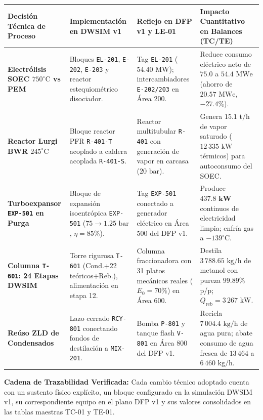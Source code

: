 \documentclass[10pt,landscape]{article}
\begin{document}
\scriptsize
\renewcommand{\arraystretch}{1.18}
\begin{tabularx}{\textwidth}{p{3.2cm} p{3.4cm} p{3.6cm} X}
  \toprule
  \rowcolor{tableheader}
  \textbf{\color{white}Decisión Técnica de Proceso} & \textbf{\color{white}Implementación en DWSIM v1} & \textbf{\color{white}Reflejo en DFP v1 y LE-01} & \textbf{\color{white}Impacto Cuantitativo en Balances (TC/TE)} \\
  \midrule
  \rowcolor{roweven}
  \textbf{Electrólisis SOEC $750^\circ\text{C}$ vs PEM} & 
  Bloques \texttt{EL-201}, \texttt{E-202}, \texttt{E-203} y reactor estequiométrico disociador. & 
  Tag \texttt{EL-201} ($54.40\text{ MW}$); intercambiadores \texttt{E-202/203} en Área 200. & 
  Reduce consumo eléctrico neto de $75.0$ a $54.4\text{ MWe}$ (ahorro de $20.57\text{ MWe}$, $-27.4\%$). \\
  \rowcolor{rowodd}
  \textbf{Reactor Lurgi BWR $245^\circ\text{C}$} & 
  Bloque reactor PFR \texttt{R-401-T} acoplado a caldera acoplada \texttt{R-401-S}. & 
  Reactor multitubular \texttt{R-401} con generación de vapor en carcasa ($20\text{ bar}$). & 
  Genera $15.1\text{ t/h}$ de vapor saturado ($12\,335\text{ kW}$ térmicos) para autoconsumo del SOEC. \\
  \rowcolor{roweven}
  \textbf{Turboexpansor \texttt{EXP-501} en Purga} & 
  Bloque de expansión isoentrópica \texttt{EXP-501} ($75 \to 1.25\text{ bar}$, $\eta=85\%$). & 
  Tag \texttt{EXP-501} conectado a generador eléctrico en Área 500 del DFP v1. & 
  Produce $\mathbf{437.8\text{ kW}}$ continuos de electricidad limpia; enfría gas a $-139^\circ\text{C}$. \\
  \rowcolor{rowodd}
  \textbf{Columna \texttt{T-601}: 24 Etapas DWSIM} & 
  Torre rigurosa \texttt{T-601} (Cond.+22 teóricos+Reb.), alimentación en etapa 12. & 
  Columna fraccionadora con 31 platos mecánicos reales ($E_0=70\%$) en Área 600. & 
  Destila $3\,788.65\text{ kg/h}$ de metanol con pureza $99.89\%$ p/p; $Q_{\text{reb}} = 3\,267\text{ kW}$. \\
  \rowcolor{roweven}
  \textbf{Reúso ZLD de Condensados} & 
  Lazo cerrado \texttt{RCY-801} conectando fondos de destilación a \texttt{MIX-201}. & 
  Bomba \texttt{P-801} y tanque flash \texttt{V-801} en Área 800 del DFP v1. & 
  Recicla $7\,004.4\text{ kg/h}$ de agua pura; abate consumo de agua fresca de $13\,464$ a $6\,460\text{ kg/h}$. \\
  \bottomrule
\end{tabularx}

\vspace{2pt}
\begin{tcolorbox}[colback=white,colframe=navyblue!40,arc=1.5mm,boxrule=0.6pt,top=2pt,bottom=2pt,left=6pt,right=6pt]
  \scriptsize
  \textbf{\color{navyblue}Cadena de Trazabilidad Verificada:} Cada cambio técnico adoptado cuenta con un sustento físico explícito, un bloque configurado en la simulación DWSIM v1, su correspondiente equipo en el plano DFP v1 y sus valores consolidados en las tablas maestras TC-01 y TE-01.
\end{tcolorbox}
\end{document}
